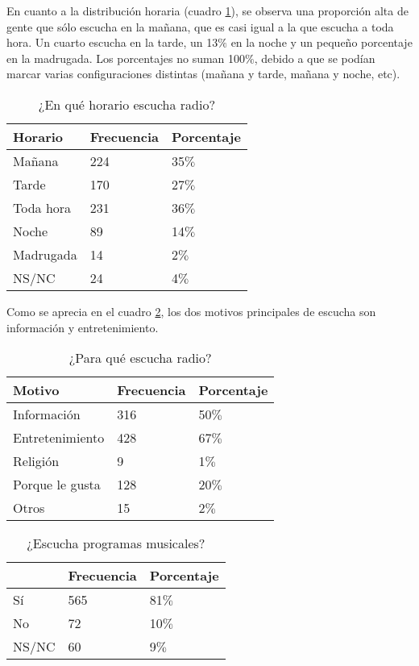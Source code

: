 \indent En cuanto a la distribución horaria (cuadro \ref{HorasRadioTabla}), se observa una proporción alta de gente que sólo escucha en la mañana, que es casi igual a la que escucha a toda hora. Un cuarto escucha en la tarde, un 13$\%$ en la noche y un pequeño porcentaje en la madrugada. Los porcentajes no suman 100$\%$, debido a que se podían marcar varias configuraciones distintas (mañana y tarde, mañana y noche, etc).

\begin{table}[ht]
	\centering
{}
		\begin{tabular}{|l|l|l|}\hline
	\textbf{Horario}&\textbf{Frecuencia}&\textbf{Porcentaje}\\\hline\hline
			Mañana	&	224&	35$\%$\\\hline
			Tarde	&	170&	27$\%$\\\hline
			Toda hora	&	231&	36$\%$\\\hline
			Noche	&	89&	14$\%$\\\hline
			Madrugada	&	14&	2$\%$\\\hline
			NS/NC	&	24&	4$\%$\\\hline
		\end{tabular}
	  \caption{¿En qué horario escucha radio?}
	  \label{HorasRadioTabla}
\end{table}

\indent Como se aprecia en el cuadro \ref{PourquoiTabla}, los dos motivos principales de escucha son información y entretenimiento.\\

\begin{table}[ht]
	\centering
{}
		\begin{tabular}{|l|l|l|}\hline
	\textbf{Motivo}&\textbf{Frecuencia}&\textbf{Porcentaje}\\\hline\hline
			Información&	316&	50$\%$\\\hline
			Entretenimiento	&	428&	67$\%$\\\hline
			Religión	&	9&	1$\%$\\\hline
			Porque le gusta	&	128&	20$\%$\\\hline
			Otros	&	15&	2$\%$\\\hline
		\end{tabular}
	  \caption{¿Para qué escucha radio?}
	  \label{PourquoiTabla}
\end{table}


\begin{table}[ht]
	\centering
{}
		\begin{tabular}{|l|l|l|}\hline
	\textbf{}&\textbf{Frecuencia}&\textbf{Porcentaje}\\\hline\hline
			Sí	&	565&	81$\%$\\\hline
			No	&	72&	10$\%$\\\hline
			NS/NC	&	60&	9$\%$\\\hline
		\end{tabular}
	  \caption{¿Escucha programas musicales?}
	  \label{MusiqueTabla}
\end{table}

